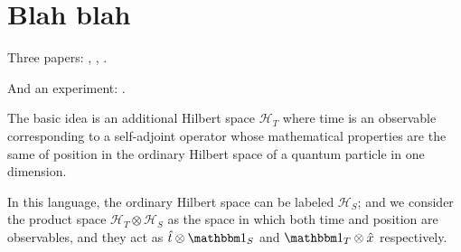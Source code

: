 \section{Blah blah}

Three papers: \cite{Lloyd:Time}, \cite{Marletto:Evolution}, \cite{Prvanovic}.

And an experiment: \cite{Moreva:synthetic}.

The basic idea is an additional Hilbert space $\mathcal{H}_T$ where time is an observable
corresponding to
a self-adjoint operator whose mathematical properties are the same of position in the
ordinary Hilbert space of a quantum particle in one dimension.

In this language, the ordinary Hilbert space can be labeled $\mathcal{H}_S$;
and we consider the product space $\mathcal{H}_T \otimes \mathcal{H}_S$ as
the space in which both time and position are observables, and they act as
$\hat{t} \otimes \idop_S$ and $\idop_T \otimes \hat{x}$
respectively.